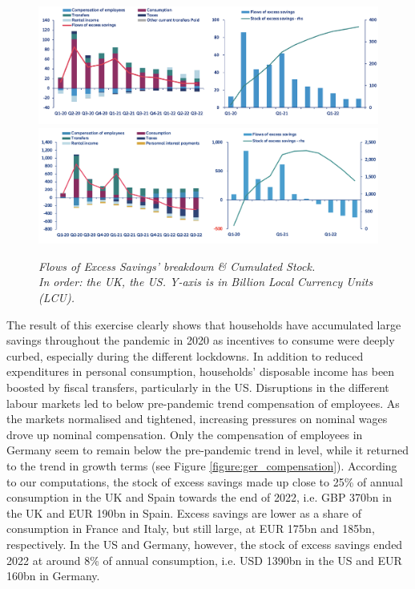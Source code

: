 \begin{figure}[H]
    \centering
    \caption{\textit{Flows of Excess Savings’ breakdown \& Cumulated Stock. \\ In order: the UK, the US. Y-axis is in Billion Local Currency Units (LCU).}}
    \includegraphics[width=.9\textwidth]{Core/1.Savings/img/xUK.png}
    \includegraphics[width=.92\textwidth]{Core/1.Savings/img/xUS2.png}
    \label{figure:Flows2}
\end{figure}

The result of this exercise clearly shows that households have accumulated large savings throughout the pandemic in 2020 as incentives to consume were deeply curbed, especially during the different lockdowns. 
In addition to reduced expenditures in personal consumption, households’ disposable income has been boosted by fiscal transfers, particularly in the US. 
Disruptions in the different labour markets led to below pre-pandemic trend compensation of employees. As the markets normalised and tightened, increasing pressures on nominal wages drove up nominal compensation. 
Only the compensation of employees in Germany seem to remain below the pre-pandemic trend in level, while it returned to the trend in growth terms (see Figure \ref{figure:ger_compensation}). 
According to our computations, the stock of excess savings made up close to 25\% of annual consumption in the UK and Spain towards the end of 2022, i.e. GBP 370bn in the UK and EUR 190bn in Spain. 
Excess savings are lower as a share of consumption in France and Italy, but still large, at EUR 175bn and 185bn, respectively. 
In the US and Germany, however, the stock of excess savings ended 2022 at around 8\% of annual consumption, i.e. USD 1390bn in the US and EUR 160bn in Germany.

